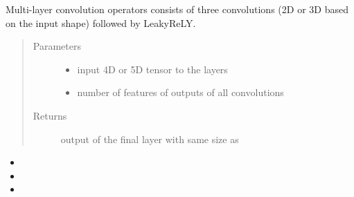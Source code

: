 \documentclass[letterpaper,10pt,english]{sphinxmanual}
\begin{document}

\begin{fulllineitems}
\label{\detokenize{index:unet.ops.conv_layer}}
Multi-layer convolution operators consists of three convolutions (2D or 3D based on the input shape) followed by
LeakyReLY.
\begin{quote}\begin{description}
\item[{Parameters}] \leavevmode\begin{itemize}
\item {} 
 \textendash{} input 4D or 5D tensor to the layers

\item {} 
 \textendash{} number of features of outputs of all convolutions

\end{itemize}

\item[{Returns}] \leavevmode
output of the final layer with same size as 

\end{description}\end{quote}



\begin{itemize}
\item {} 

\item {} 

\item {} 

\end{itemize}



\end{fulllineitems}

\end{document}
